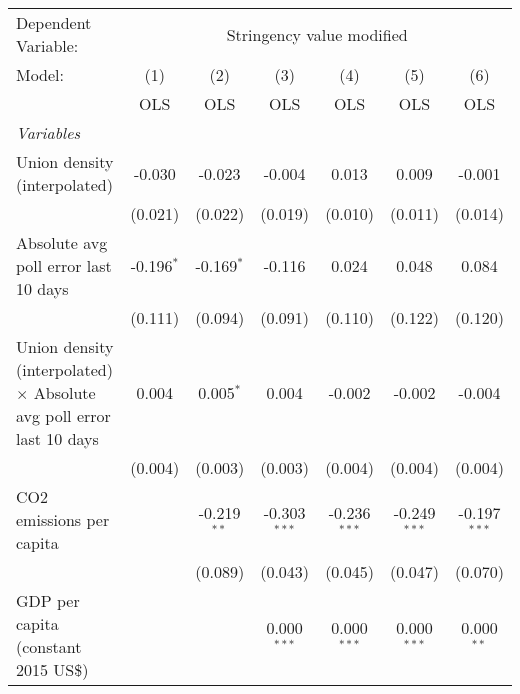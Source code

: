 
\begingroup
\centering
\begin{tabular}{lcccccc}
   \toprule
   Dependent Variable: & \multicolumn{6}{c}{Stringency value modified}\\
   Model:                                                                      & (1)          & (2)           & (3)            & (4)            & (5)            & (6)\\  
                                                                               &  OLS         & OLS           & OLS            & OLS            & OLS            & OLS\\  
   \midrule
   \emph{Variables}\\
   Union density (interpolated)                                                & -0.030       & -0.023        & -0.004         & 0.013          & 0.009          & -0.001\\   
                                                                               & (0.021)      & (0.022)       & (0.019)        & (0.010)        & (0.011)        & (0.014)\\   
   Absolute avg poll error last 10 days                                        & -0.196$^{*}$ & -0.169$^{*}$  & -0.116         & 0.024          & 0.048          & 0.084\\   
                                                                               & (0.111)      & (0.094)       & (0.091)        & (0.110)        & (0.122)        & (0.120)\\   
   Union density (interpolated) $\times$ Absolute avg poll error last 10 days  & 0.004        & 0.005$^{*}$   & 0.004          & -0.002         & -0.002         & -0.004\\   
                                                                               & (0.004)      & (0.003)       & (0.003)        & (0.004)        & (0.004)        & (0.004)\\   
   CO2 emissions per capita                                                    &              & -0.219$^{**}$ & -0.303$^{***}$ & -0.236$^{***}$ & -0.249$^{***}$ & -0.197$^{***}$\\   
                                                                               &              & (0.089)       & (0.043)        & (0.045)        & (0.047)        & (0.070)\\   
   GDP per capita (constant 2015 US\$)                                         &              &               & 0.000$^{***}$  & 0.000$^{***}$  & 0.000$^{***}$  & 0.000$^{**}$\\   

\end{tabular}
